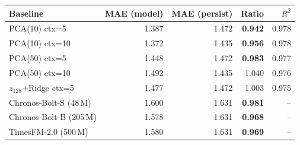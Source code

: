 \begin{tabular}{lrrrr}
  \toprule
  Baseline & MAE (model) & MAE (persist) & Ratio & $R^2$ \\
  \midrule
  PCA(10) ctx=5 & 1.387 & 1.472 & \textbf{0.942} & 0.978 \\
  PCA(10) ctx=10 & 1.372 & 1.435 & \textbf{0.956} & 0.978 \\
  PCA(50) ctx=5 & 1.448 & 1.472 & \textbf{0.983} & 0.977 \\
  PCA(50) ctx=10 & 1.492 & 1.435 & 1.040 & 0.976 \\
  \midrule
  $z_{128}$+Ridge ctx=5 & 1.477 & 1.472 & 1.003 & 0.975 \\
  \midrule
  Chronos-Bolt-S (48\,M) & 1.600 & 1.631 & \textbf{0.981} & -- \\
  Chronos-Bolt-B (205\,M) & 1.578 & 1.631 & \textbf{0.968} & -- \\
  TimesFM-2.0 (500\,M) & 1.580 & 1.631 & \textbf{0.969} & -- \\
  \bottomrule
\end{tabular}
